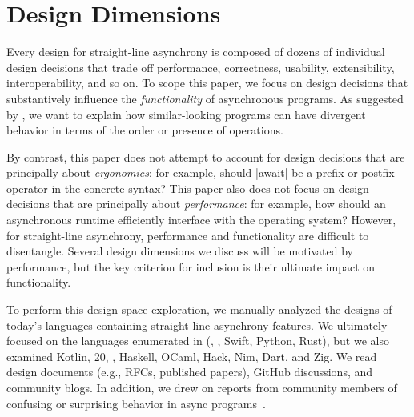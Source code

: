 

\section{Design Dimensions}\label{sec:designdims}

Every design for straight-line asynchrony is composed of dozens of individual design decisions that trade off performance, correctness, usability, extensibility, interoperability, and so on. To scope this paper, we focus on design decisions that substantively influence the \emph{functionality} of asynchronous programs. As suggested by , we want to explain how similar-looking programs can have divergent behavior in terms of the order or presence of operations.

By contrast, this paper does not attempt to account for design decisions that are principally about \emph{ergonomics}: for example, should \code|await| be a prefix or postfix operator in the concrete syntax?
This paper also does not focus on design decisions that are principally about \emph{performance}: for example, how should an asynchronous runtime efficiently interface with the operating system? However, for straight-line asynchrony, performance and functionality are difficult to disentangle. Several design dimensions we discuss will be motivated by performance, but the key criterion for inclusion is their ultimate impact on functionality.


To perform this design space exploration, we manually analyzed the designs of today's languages containing straight-line asynchrony features. We ultimately focused on the languages enumerated in  (\Js, \CSharp, Swift, Python, Rust), but we also examined Kotlin, \Cpp{}20, \FSharp, Haskell, OCaml, Hack, Nim, Dart, and Zig. We read design documents (e.g., RFCs, published papers), GitHub discussions, and community blogs. In addition, we drew on reports from community members of confusing or surprising behavior in async programs~\cite{saad_using_2021,william_how_2019,lacuna_asyncio_nodate,smith_thoughts_2016,paharia_cancelling_2025,paharia_400_2025,pacheco_397_nodate,smith_notes_2018,archibald_gotcha_2023}.


